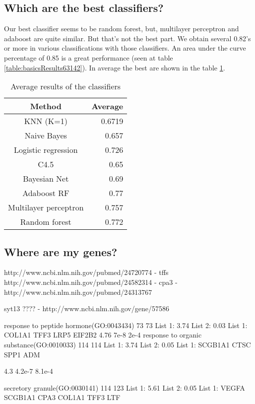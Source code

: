 \documentclass[conference,a4paper]{IEEEtran}
\begin{document}
\subsection{Which are the best classifiers?}

Our best classifier seems to be random forest, but, multilayer perceptron and adaboost are quite similar. But that's not the best part. We obtain several 0.82's or more in various classifications with those classifiers. An area under the curve percentage of 0.85 is a great performance (seen at table \ref{table:basicsResults63142}). In average the best are shown in the table \ref{table:OverallMethods}.

\begin{table}[h]
	\caption{Average results of the classifiers}
	\centering
	\begin{tabular}{c r}
		\hline\hline
		Method & Average\\ [0.2ex]
		\hline
		KNN (K=1) & 0.6719\\
		Naive Bayes & 0.657\\
		Logistic regression & 0.726\\ 
		C4.5 & 0.65\\
		Bayesian Net & 0.69\\
		Adaboost RF & 0.77\\
		Multilayer perceptron & 0.757\\
		Random forest & 0.772\\ [1ex]
		\hline
	\end{tabular}
	\label{table:OverallMethods}
\end{table}

\subsection{Where are my genes?}

http://www.ncbi.nlm.nih.gov/pubmed/24720774 - tffs
http://www.ncbi.nlm.nih.gov/pubmed/24582314 - cpa3 - http://www.ncbi.nlm.nih.gov/pubmed/24313767

syt13 ????  - http://www.ncbi.nlm.nih.gov/gene/57586

response to peptide hormone(GO:0043434)	73	73	List 1: 3.74%
List 2: 0.03%
List 1:
COL1A1
TFF3
LRP5
EIF2B2
4.76	7e-8	2e-4
response to organic substance(GO:0010033)	114	114	List 1: 3.74%
List 2: 0.05%
List 1:
SCGB1A1
CTSC
SPP1
ADM

4.3	4.2e-7	8.1e-4


secretory granule(GO:0030141)	114	123	List 1: 5.61%
List 2: 0.05%
List 1:
VEGFA
SCGB1A1
CPA3
COL1A1
TFF3
LTF
\end{document}
